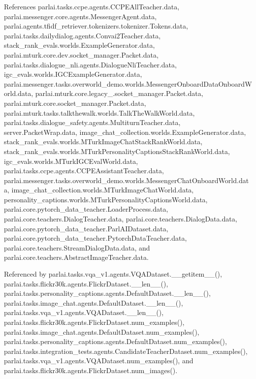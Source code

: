 References parlai.\+tasks.\+ccpe.\+agents.\+C\+C\+P\+E\+All\+Teacher.\+data, parlai.\+messenger.\+core.\+agents.\+Messenger\+Agent.\+data, parlai.\+agents.\+tfidf\+\_\+retriever.\+tokenizers.\+tokenizer.\+Tokens.\+data, parlai.\+tasks.\+dailydialog.\+agents.\+Convai2\+Teacher.\+data, stack\+\_\+rank\+\_\+evals.\+worlds.\+Example\+Generator.\+data, parlai.\+mturk.\+core.\+dev.\+socket\+\_\+manager.\+Packet.\+data, parlai.\+tasks.\+dialogue\+\_\+nli.\+agents.\+Dialogue\+Nli\+Teacher.\+data, igc\+\_\+evals.\+worlds.\+I\+G\+C\+Example\+Generator.\+data, parlai.\+messenger.\+tasks.\+overworld\+\_\+demo.\+worlds.\+Messenger\+Onboard\+Data\+Onboard\+World.\+data, parlai.\+mturk.\+core.\+legacy\+\_.\+socket\+\_\+manager.\+Packet.\+data, parlai.\+mturk.\+core.\+socket\+\_\+manager.\+Packet.\+data, parlai.\+mturk.\+tasks.\+talkthewalk.\+worlds.\+Talk\+The\+Walk\+World.\+data, parlai.\+tasks.\+dialogue\+\_\+safety.\+agents.\+Multiturn\+Teacher.\+data, server.\+Packet\+Wrap.\+data, image\+\_\+chat\+\_\+collection.\+worlds.\+Example\+Generator.\+data, stack\+\_\+rank\+\_\+evals.\+worlds.\+M\+Turk\+Image\+Chat\+Stack\+Rank\+World.\+data, stack\+\_\+rank\+\_\+evals.\+worlds.\+M\+Turk\+Personality\+Captions\+Stack\+Rank\+World.\+data, igc\+\_\+evals.\+worlds.\+M\+Turk\+I\+G\+C\+Eval\+World.\+data, parlai.\+tasks.\+ccpe.\+agents.\+C\+C\+P\+E\+Assistant\+Teacher.\+data, parlai.\+messenger.\+tasks.\+overworld\+\_\+demo.\+worlds.\+Messenger\+Chat\+Onboard\+World.\+data, image\+\_\+chat\+\_\+collection.\+worlds.\+M\+Turk\+Image\+Chat\+World.\+data, personality\+\_\+captions.\+worlds.\+M\+Turk\+Personality\+Captions\+World.\+data, parlai.\+core.\+pytorch\+\_\+data\+\_\+teacher.\+Loader\+Process.\+data, parlai.\+core.\+teachers.\+Dialog\+Teacher.\+data, parlai.\+core.\+teachers.\+Dialog\+Data.\+data, parlai.\+core.\+pytorch\+\_\+data\+\_\+teacher.\+Parl\+A\+I\+Dataset.\+data, parlai.\+core.\+pytorch\+\_\+data\+\_\+teacher.\+Pytorch\+Data\+Teacher.\+data, parlai.\+core.\+teachers.\+Stream\+Dialog\+Data.\+data, and parlai.\+core.\+teachers.\+Abstract\+Image\+Teacher.\+data.



Referenced by parlai.\+tasks.\+vqa\+\_\+v1.\+agents.\+V\+Q\+A\+Dataset.\+\_\+\+\_\+getitem\+\_\+\+\_\+(), parlai.\+tasks.\+flickr30k.\+agents.\+Flickr\+Dataset.\+\_\+\+\_\+len\+\_\+\+\_\+(), parlai.\+tasks.\+personality\+\_\+captions.\+agents.\+Default\+Dataset.\+\_\+\+\_\+len\+\_\+\+\_\+(), parlai.\+tasks.\+image\+\_\+chat.\+agents.\+Default\+Dataset.\+\_\+\+\_\+len\+\_\+\+\_\+(), parlai.\+tasks.\+vqa\+\_\+v1.\+agents.\+V\+Q\+A\+Dataset.\+\_\+\+\_\+len\+\_\+\+\_\+(), parlai.\+tasks.\+flickr30k.\+agents.\+Flickr\+Dataset.\+num\+\_\+examples(), parlai.\+tasks.\+image\+\_\+chat.\+agents.\+Default\+Dataset.\+num\+\_\+examples(), parlai.\+tasks.\+personality\+\_\+captions.\+agents.\+Default\+Dataset.\+num\+\_\+examples(), parlai.\+tasks.\+integration\+\_\+tests.\+agents.\+Candidate\+Teacher\+Dataset.\+num\+\_\+examples(), parlai.\+tasks.\+vqa\+\_\+v1.\+agents.\+V\+Q\+A\+Dataset.\+num\+\_\+examples(), and parlai.\+tasks.\+flickr30k.\+agents.\+Flickr\+Dataset.\+num\+\_\+images().

